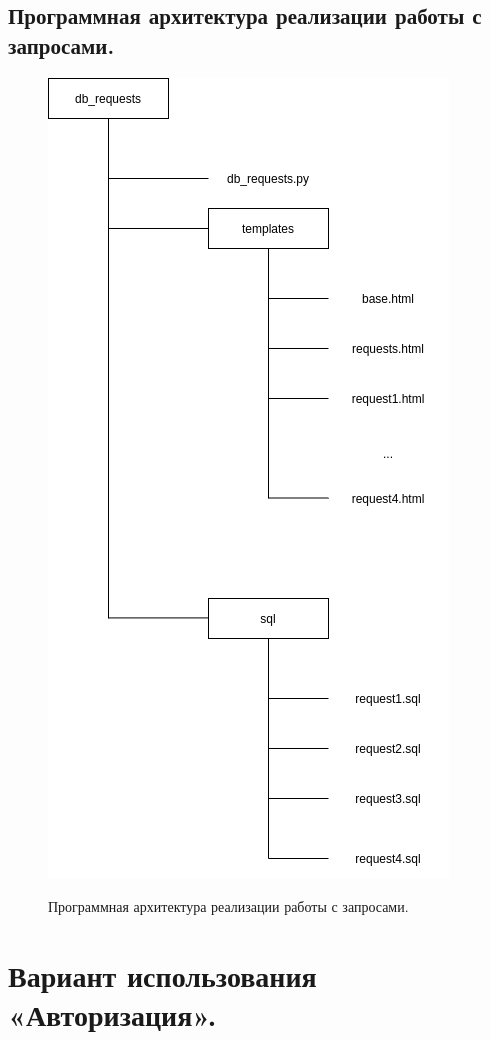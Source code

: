 \documentclass[12pt, a4paper]{article}
\begin{document}
    \subsection{Программная архитектура реализации работы с запросами.}
    \begin{figure}[ht!]
    	\centering    %
    	\includegraphics[height=0.6\textheight]{pictures/requests_arch.png}
    	\label{fig:pic6} %
    	\caption{Программная архитектура реализации работы с запросами.}
    \end{figure}
    \newpage
    
    \section{Вариант использования «Авторизация». }
\end{document}
